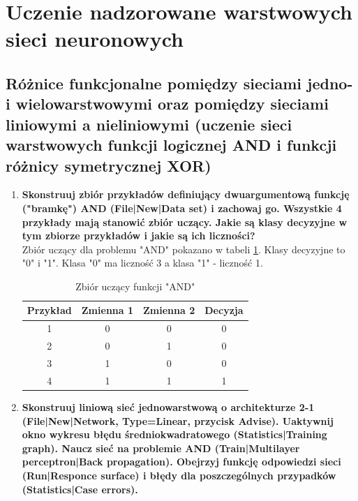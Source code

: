 
\section{Uczenie nadzorowane warstwowych sieci neuronowych}

\subsection{Różnice funkcjonalne pomiędzy sieciami jedno- i wielowarstwowymi oraz pomiędzy sieciami liniowymi a nieliniowymi (uczenie sieci warstwowych funkcji logicznej AND i funkcji różnicy symetrycznej XOR)}

\begin{enumerate}
\item \textbf{
Skonstruuj zbiór przykładów definiujący dwuargumentową funkcję ("bramkę") AND (File|New|Data set) i zachowaj go. Wszystkie 4 przykłady mają stanowić zbiór uczący. Jakie są klasy decyzyjne w tym zbiorze przykładów i jakie są ich liczności?}
\\Zbiór uczący dla problemu "AND" pokazano w tabeli \ref{tab:dataset_and}. Klasy decyzyjne to "0" i "1". Klasa "0" ma liczność 3 a klasa "1" - liczność 1.
\begin{table}[ch]
	\centering
	\caption{Zbiór uczący funkcji "AND"\label{tab:dataset_and}}
	\begin{tabular}{|c|c|c|c|}
	\hline Przykład & Zmienna 1 & Zmienna 2 & Decyzja \\ 
	\hline 1 & 0 & 0 & 0 \\ 
	\hline 2 & 0 & 1 & 0 \\ 
	\hline 3 & 1 & 0 & 0 \\ 
	\hline 4 & 1 & 1 & 1 \\ 
	\hline 
	\end{tabular} 
\end{table}


\item \textbf{
Skonstruuj liniową sieć jednowarstwową o architekturze 2-1 (File|New|Network, Type=Linear, przycisk Advise). Uaktywnij okno wykresu błędu średniokwadratowego (Statistics|Training graph). Naucz sieć na problemie AND (Train|Multilayer perceptron|Back propagation). Obejrzyj funkcję odpowiedzi sieci (Run|Responce surface) i błędy dla poszczególnych przypadków (Statistics|Case errors).}
 

\end{enumerate}

